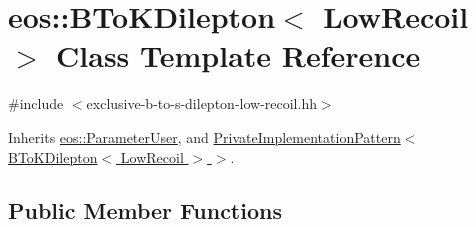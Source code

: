 \hypertarget{classeos_1_1BToKDilepton_3_01LowRecoil_01_4}{
\section{eos::BToKDilepton$<$ LowRecoil $>$ Class Template Reference}
\label{classeos_1_1BToKDilepton_3_01LowRecoil_01_4}
}


{\ttfamily \#include $<$exclusive-\/b-\/to-\/s-\/dilepton-\/low-\/recoil.hh$>$}

Inherits \hyperlink{classeos_1_1ParameterUser}{eos::ParameterUser}, and \hyperlink{classeos_1_1PrivateImplementationPattern}{PrivateImplementationPattern$<$ BToKDilepton$<$ LowRecoil $>$ $>$}.\subsection*{Public Member Functions}
